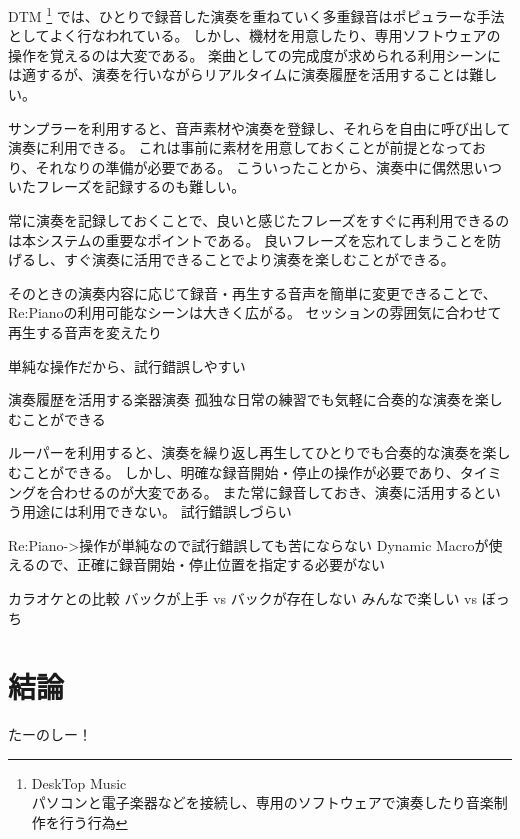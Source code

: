 \documentclass[submit,techreq]{ec2017}
\begin{document}

DTM
\footnote{\textsf{DeskTop Music\\パソコンと電子楽器などを接続し、専用のソフトウェアで演奏したり音楽制作を行う行為}}
では、ひとりで録音した演奏を重ねていく多重録音はポピュラーな手法としてよく行なわれている。
しかし、機材を用意したり、専用ソフトウェアの操作を覚えるのは大変である。
楽曲としての完成度が求められる利用シーンには適するが、演奏を行いながらリアルタイムに演奏履歴を活用することは難しい。

サンプラーを利用すると、音声素材や演奏を登録し、それらを自由に呼び出して演奏に利用できる。
これは事前に素材を用意しておくことが前提となっており、それなりの準備が必要である。
こういったことから、演奏中に偶然思いついたフレーズを記録するのも難しい。

常に演奏を記録しておくことで、良いと感じたフレーズをすぐに再利用できるのは本システムの重要なポイントである。
良いフレーズを忘れてしまうことを防げるし、すぐ演奏に活用できることでより演奏を楽しむことができる。

そのときの演奏内容に応じて録音・再生する音声を簡単に変更できることで、Re:Pianoの利用可能なシーンは大きく広がる。
セッションの雰囲気に合わせて再生する音声を変えたり

単純な操作だから、試行錯誤しやすい

演奏履歴を活用する楽器演奏
孤独な日常の練習でも気軽に合奏的な演奏を楽しむことができる


ルーパーを利用すると、演奏を繰り返し再生してひとりでも合奏的な演奏を楽しむことができる。
しかし、明確な録音開始・停止の操作が必要であり、タイミングを合わせるのが大変である。
また常に録音しておき、演奏に活用するという用途には利用できない。
試行錯誤しづらい


Re:Piano->操作が単純なので試行錯誤しても苦にならない
Dynamic Macroが使えるので、正確に録音開始・停止位置を指定する必要がない

カラオケとの比較
バックが上手 vs バックが存在しない
みんなで楽しい vs ぼっち

\section{結論}

たーのしー！






\end{document}
